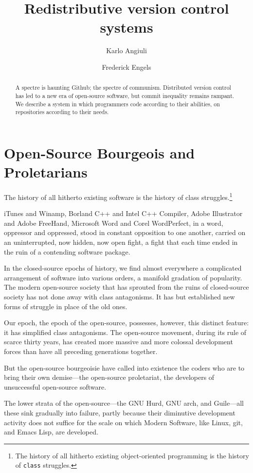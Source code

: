 \documentclass[10pt]{article}
\title{Redistributive version control systems}
\author{Karlo Angiuli \and Frederick Engels}
\begin{document}
\maketitle

\begin{abstract}\noindent
A spectre is haunting Github; the spectre of communism. Distributed version
control has led to a new era of open-source software, but commit inequality
remains rampant. We describe a system in which programmers code according to
their abilities, on repositories according to their needs. 
\end{abstract}

\section{Open-Source Bourgeois and Proletarians}

The history of all hitherto existing software is the history of class
struggles.\footnote{The history of all hitherto existing object-oriented
programming is the history of \texttt{class} struggles.}

iTunes and Winamp,
Borland C++ and Intel C++ Compiler,
Adobe Illustrator and Adobe FreeHand,
Microsoft Word and Corel WordPerfect,
in a word, oppressor and oppressed, stood in constant opposition to one another,
carried on an uninterrupted, now hidden, now open fight, a fight that each time
ended in the ruin of a contending software package.

In the closed-source epochs of history, we find almost everywhere a complicated
arrangement of software into various orders, a manifold gradation of popularity.
The modern open-source society that has sprouted from the ruins of closed-source
society has not done away with class antagonisms. It has but established new
forms of struggle in place of the old ones.

Our epoch, the epoch of the open-source, possesses, however, this distinct
feature: it has simplified class antagonisms. The open-source movement, during
its rule of scarce thirty years, has created more massive and more colossal
development forces than have all preceding generations together.

But the open-source bourgeoisie have called into existence the coders who are to
bring their own demise---the open-source proletariat, the developers of
unsuccessful open-source software.

The lower strata of the open-source---the GNU Hurd, GNU arch, and Guile---all
these sink gradually into failure, partly because their diminutive development
activity does not suffice for the scale on which Modern Software, like Linux,
git, and Emacs Lisp, are developed.
\end{document}
